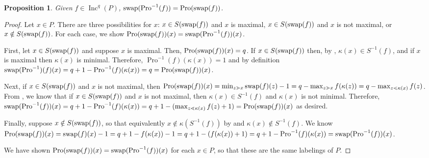 \documentclass[11pt]{amsart}
\newtheorem{proposition}[theorem]{Proposition}
\theoremstyle{definition}
\DeclareMathOperator{\Inc}{\mathrm{Inc}}
\DeclareMathOperator{\Pro}{\mathrm{Pro}}
\newcommand{\swap}{\textnormal{swap}}
\begin{document}
\begin{proposition}\label{thm:SwapAndPro}
Given $f \in \Inc^q(P)$, $\swap(\Pro^{-1}(f)) =\Pro(\swap(f))$. 
\end{proposition}

\begin{proof}
Let $x \in P$. There are three possibilities for $x$: $x \in S(\swap(f))$ and $x$ is maximal, $x \in S(\swap(f))$ and $x$ is not maximal, or $x \notin S(\swap(f))$. For each case, we show $\Pro(\swap(f))(x) = \swap(\Pro^{-1}(f))(x)$.

First, let $x \in S(\swap(f))$ and suppose $x$ is maximal. Then, $\Pro(\swap(f))(x) = q$. If $x \in S(\swap(f))$ then, by , $\kappa(x) \in S^{-1}(f)$, and if $x$ is maximal then $\kappa(x)$ is minimal. Therefore, $\Pro^{-1}(f)(\kappa(x)) = 1$ and by definition $\swap(\Pro^{-1})(f)(x) = q+1-\Pro^{-1}(f)(\kappa(x)) = q = \Pro(\swap(f))(x)$.

Next, if $x \in S(\swap(f))$ and $x$ is not maximal, then $\Pro(\swap(f))(x) = \min_{z \gtrdot x} \swap(f)(z) - 1 = q - \max_{z \gtrdot x} f(\kappa(z)) = q - \max_{z \lessdot \kappa(x)} f(z)$. From , we know that if $x \in S(\swap(f))$ and $x$ is not maximal, then $\kappa(x) \in S^{-1}(f)$ and $\kappa(x)$ is not minimal. Therefore, $\swap(\Pro^{-1}(f))(x) = q+1-\Pro^{-1}(f)(\kappa(x)) = q +1 - (\max_{z \lessdot \kappa(x)} f(z) + 1) = \Pro(\swap(f))(x)$ as desired.

Finally, suppose $x \notin S(\swap(f))$, so that equivalently $x \notin \kappa(S^{-1}(f))$ by  and $\kappa(x) \notin S^{-1}(f)$. We know $\Pro(\swap(f))(x) = \swap(f)(x) - 1 = q + 1 - f(\kappa(x)) - 1= q+1-(f(\kappa(x)) + 1) = q+1-\Pro^{-1}(f)(\kappa(x)) = \swap(\Pro^{-1}(f))(x)$.

We have shown $\Pro(\swap(f))(x) = \swap(\Pro^{-1}(f))(x)$ for each $x \in P$, so that these are the same labelings of $P$.
\end{proof}
\end{document}
